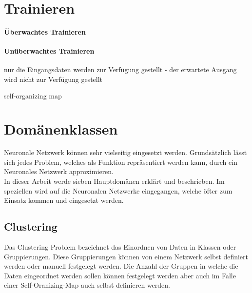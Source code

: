 \section{Trainieren}

\paragraph{Überwachtes Trainieren}



\paragraph{Unüberwachtes Trainieren}

nur die Eingangsdaten werden zur Verfügung gestellt - der erwartete Ausgang wird nicht zur Verfügung gestellt

self-organizing map

\section{Domänenklassen}
\label{sec:Domänenklassen}

Neuronale Netzwerk können sehr vielseitig eingesetzt werden. 
Grundsätzlich lässt sich jedes Problem, welches als Funktion repräsentiert werden kann, durch ein Neuronales Netzwerk approximieren. \\

\noindent
In dieser Arbeit werde sieben Hauptdomänen erklärt und beschrieben. %
Im speziellen wird auf die Neuronalen Netzwerke eingegangen, welche öfter zum Einsatz kommen und eingesetzt werden.

\subsection{Clustering}
\label{subsec:Clustering}

Das Clustering Problem bezeichnet das Einordnen von Daten in Klassen oder Gruppierungen. 
Diese Gruppierungen können von einem Netzwerk selbst definiert werden oder manuell festgelegt werden. 
Die Anzahl der Gruppen in welche die Daten eingeordnet werden sollen können festgelegt werden aber auch im Falle einer Self-Oranizing-Map auch selbst definieren werden.

